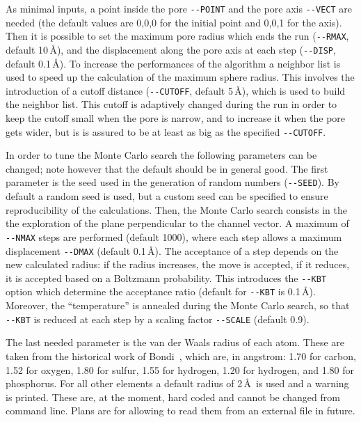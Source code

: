 \documentclass[11pt,twoside,onecolumn,a4paper,openright,notitlepage]{book}[2001/04/21]
\begin{document}
As minimal inputs, a point inside the pore \verb#--POINT# and the pore axis \verb#--VECT# are needed (the default values are 0,0,0 for the initial point and 0,0,1 for the axis). Then it is possible to set the maximum pore radius which ends the run (\verb#--RMAX#, default 10\,\AA), and the displacement along the pore axis at each step (\verb#--DISP#, default 0.1\,\AA). To increase the performances of the algorithm a neighbor list is used to speed up the calculation of the maximum sphere radius. This involves the introduction of a cutoff distance (\verb#--CUTOFF#, default 5\,\AA), which is used to build the neighbor list. This cutoff is adaptively changed during the run in order to keep the cutoff small when the pore is narrow, and to increase it when the pore gets wider, but is is assured to be at least as big as the specified \verb#--CUTOFF#. 

In order to tune the Monte Carlo search the following parameters can be changed; note however that the default should be in general good. The first parameter is the seed used in the generation of random numbers (\verb#--SEED#). By default a random seed is used, but a custom seed can be specified to ensure reproducibility of the calculations. Then, the Monte Carlo search consists in the the exploration of the plane perpendicular to the channel vector. A maximum of \verb#--NMAX# steps are performed (default 1000), where each step allows a maximum displacement \verb#--DMAX# (default 0.1\,\AA). The acceptance of a step depends on the new calculated radius: if the radius increases, the move is accepted, if it reduces, it is accepted based on a Boltzmann probability. This introduces the \verb#--KBT# option which determine the acceptance ratio (default for \verb#--KBT# is 0.1\,\AA). Moreover, the ``temperature'' is annealed during the Monte Carlo search, so that \verb#--KBT# is reduced at each step by a scaling factor \verb#--SCALE# (default 0.9). 

The last needed parameter is the van der Waals radius of each atom. These are taken from the historical work of Bondi~\cite{bondi1964vanderwaals}, which are, in angstrom: 1.70 for carbon, 1.52 for oxygen, 1.80 for sulfur, 1.55 for hydrogen, 1.20 for hydrogen, and 1.80 for phosphorus. For all other elements a default radius of 2\,\AA\ is used and a warning is printed. These are, at the moment, hard coded and cannot be changed from command line. Plans are for allowing to read them from an external file in future. 
\end{document}
